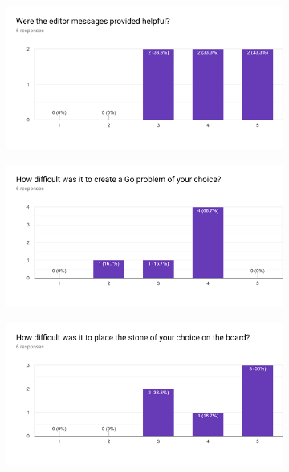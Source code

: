\documentclass{l4proj}
\begin{document}
\begin{appendices}
\begin{figure}[H]
\centering
\begin{subfigure}[b]{\textwidth}
\centering
\includegraphics[width=\textwidth]{A1/13.png}
\end{subfigure}
\end{figure}

\begin{figure}[H]
\centering
\begin{subfigure}[b]{\textwidth}
\centering
\includegraphics[width=\textwidth]{A1/14.png}
\end{subfigure}
\end{figure}



\begin{figure}[H]
\centering
\begin{subfigure}[b]{\textwidth}
\centering
\includegraphics[width=\textwidth]{A1/15.png}
\end{subfigure}
\end{figure}



\end{appendices}
\end{document}
